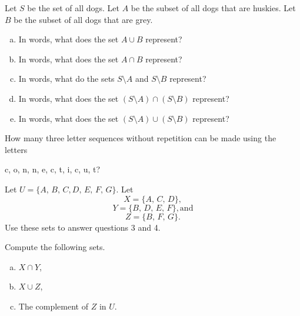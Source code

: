 \documentclass[12pt]{amsart}
\begin{document}
\begin{thm}[10 Points]\label{ex4}
  Let $S$ be the set of all dogs.
  Let $A$ be the subset of all dogs that are huskies.
  Let $B$ be the subset of all dogs that are grey.
  \begin{enumerate}[(a)]
  \item
    In words, what does the set $A \cup B$ represent?
    \vspace{1.5in}
  \item
    In words, what does the set $A \cap B$ represent?
    \vspace{1.5in}
  \item
    In words, what do the sets $S \setminus A$ and $S \setminus B$ represent?
    \vspace{1.5in}
  \item
    In words, what does the set $\left(S \setminus A\right) \cap \left(S \setminus B\right)$ represent?
    \vspace{1.5in}
  \item
    In words, what does the set $\left(S \setminus A\right) \cup \left(S \setminus B\right)$ represent?
  \end{enumerate}
\end{thm}

\newpage

\begin{thm}[10 Points]\label{ex3}
  How many three letter sequences without repetition can be made using the letters
  \begin{center}c, o, n, n, e, c, t, i, c, u, t?\end{center}
\end{thm}

\newpage

\noindent Let $U = \{A,\, B,\, C, D,\, E,\, F,\, G\}$.
Let 
$$X = \{A,\, C,\, D\},$$
$$Y = \{B,\, D,\, E,\, F\}, \text{and}$$
$$Z = \{B,\, F,\,G\}.$$
Use these sets to answer questions 3 and 4.
\begin{thm}[10 Points]\label{ex4}
  Compute the following sets.
  \begin{enumerate}[(a)]
  \item
    $X \cap Y$,
    \vspace{1in}
  \item
    $X \cup Z$,
    \vspace{1in}
  \item
    The complement of $Z$ in $U$.
    \vspace{1in}
  \end{enumerate}
\end{thm}
\end{document}

